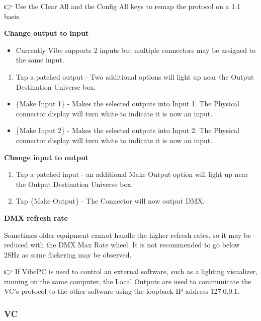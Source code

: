 \documentclass[
]{article}
\providecommand{\tightlist}{%
  \setlength{\itemsep}{0pt}\setlength{\parskip}{0pt}}
\begin{document}
👉 Use the Clear All and the Config All keys to remap the protocol on a 1:1 basis.

\textbf{Change output to input}

\begin{itemize}
\tightlist
\item
  Currently Vibe supports 2 inputs but multiple connectors may be assigned to the same input.
\end{itemize}

\begin{enumerate}
\def\labelenumi{\arabic{enumi}.}
\tightlist
\item
  Tap a patched output - Two additional options will light up near the Output Destination Universe box.
\end{enumerate}

\begin{itemize}
\item
  \{Make Input 1\} - Makes the selected outputs into Input 1. The Physical connector display will turn white to indicate it is now an input.
\item
  \{Make Input 2\} - Makes the selected outputs into Input 2. The Physical connector display will turn white to indicate it is now an input.
\end{itemize}

\textbf{Change input to output}

\begin{enumerate}
\def\labelenumi{\arabic{enumi}.}
\item
  Tap a patched input - an additional Make Output option will light up near the Output Destination Universe box.
\item
  Tap \{Make Output\} - The Connector will now output DMX.
\end{enumerate}

\textbf{DMX refresh rate}

Sometimes older equipment cannot handle the higher refresh rates, so it may be reduced with the DMX Max Rate wheel. It is not recommended to go below 28Hz as some flickering may be observed.

👉 If VibePC is used to control an external software, such as a lighting visualizer, running on the same computer, the Local Outputs are used to communicate the VC's protocol to the other software using the loopback IP address 127.0.0.1.

\hypertarget{vc}{%
\subsubsection{VC}\label{vc}}
\end{document}
